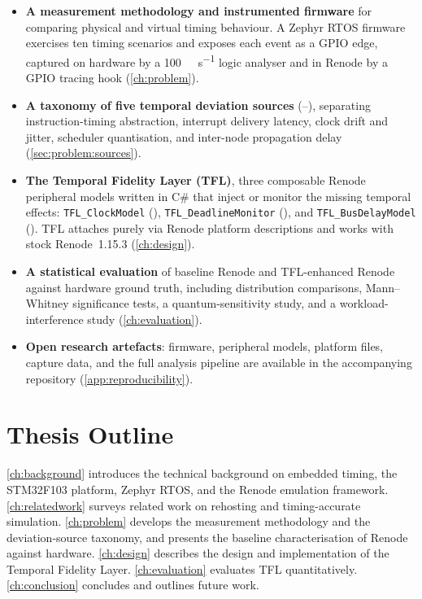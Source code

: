 \begin{itemize}
  \item \textbf{A measurement methodology and instrumented firmware}
        for comparing physical and virtual timing behaviour. A Zephyr
        RTOS firmware exercises ten timing scenarios and exposes each
        event as a GPIO edge, captured on hardware by a
        \SI{100}{\mega\sample\per\second} logic analyser and in Renode by a GPIO
        tracing hook (\cref{ch:problem}).
  \item \textbf{A taxonomy of five temporal deviation sources}
        (--), separating instruction-timing
        abstraction, interrupt delivery latency, clock drift and
        jitter, scheduler quantisation, and inter-node propagation
        delay (\cref{sec:problem:sources}).
  \item \textbf{The Temporal Fidelity Layer (TFL)}, three composable
        Renode peripheral models written in C\# that inject or monitor
        the missing temporal effects: \texttt{TFL\_ClockModel}
        (), \texttt{TFL\_DeadlineMonitor} (), and
        \texttt{TFL\_BusDelayModel} (). TFL attaches purely via
        Renode platform descriptions and works with stock
        Renode~1.15.3 (\cref{ch:design}).
  \item \textbf{A statistical evaluation} of baseline Renode and
        TFL-enhanced Renode against hardware ground truth, including
        distribution comparisons, Mann--Whitney significance tests,
        a quantum-sensitivity study, and a workload-interference study
        (\cref{ch:evaluation}).
  \item \textbf{Open research artefacts}: firmware, peripheral models,
        platform files, capture data, and the full analysis pipeline
        are available in the accompanying repository
        (\cref{app:reproducibility}).
\end{itemize}

\section{Thesis Outline}
\label{sec:intro:outline}

\cref{ch:background} introduces the technical background on embedded
timing, the STM32F103 platform, Zephyr RTOS, and the Renode emulation
framework. \cref{ch:relatedwork} surveys related work on rehosting and
timing-accurate simulation. \cref{ch:problem} develops the measurement
methodology and the deviation-source taxonomy, and presents the
baseline characterisation of Renode against hardware.
\cref{ch:design} describes the design and implementation of the
Temporal Fidelity Layer. \cref{ch:evaluation} evaluates TFL
quantitatively. \cref{ch:conclusion} concludes and outlines future
work.
